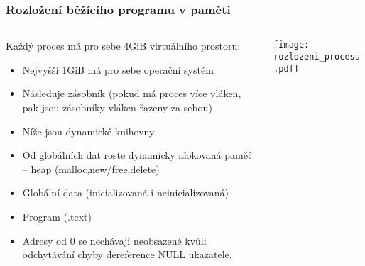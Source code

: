 \documentclass{beamer}
\begin{document}
\begin{frame}
\frametitle{Rozložení běžícího programu v paměti}

\begin{columns}
\begin{column}{0.75\textwidth}
Každý proces má pro sebe 4GiB virtuálního prostoru:
\small
\begin{itemize}
\item Nejvyšší 1GiB má pro sebe operační systém
\item Následuje zásobník (pokud má proces více vláken, pak jsou zásobníky vláken řazeny za sebou)
\item Níže jsou dynamické knihovny
\item Od globálních dat roste dynamicky alokovaná paměť -- heap (malloc,new/free,delete)
\item Globální data (inicializovaná i neinicializovaná)
\item Program (.text)
\item Adresy od 0 se nechávají neobsazené kvůli odchytávání chyby dereference NULL ukazatele.
\end{itemize}
\end{column}   
\begin{column}{0.25\textwidth}  
\texttt{[image: rozlozeni\_procesu.pdf]}
\end{column}
\end{columns}
\end{frame}
\end{document}
